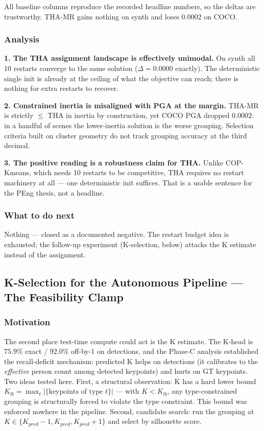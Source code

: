 \vspace{0.5em}

All baseline columns reproduce the recorded headline numbers, so the deltas are trustworthy. THA-MR gains nothing on synth and loses $0.0002$ on COCO.

\subsubsection{Analysis}

\textbf{1. The THA assignment landscape is effectively unimodal.} On synth all 10 restarts converge to the same solution ($\Delta = 0.0000$ exactly). The deterministic single init is already at the ceiling of what the objective can reach; there is nothing for extra restarts to recover.

\textbf{2. Constrained inertia is misaligned with PGA at the margin.} THA-MR is strictly $\leq$ THA in inertia by construction, yet COCO PGA dropped $0.0002$: in a handful of scenes the lower-inertia solution is the worse grouping. Selection criteria built on cluster geometry do not track grouping accuracy at the third decimal.

\textbf{3. The positive reading is a robustness claim for THA.} Unlike COP-Kmeans, which needs 10 restarts to be competitive, THA requires no restart machinery at all --- one deterministic init suffices. That is a usable sentence for the PEng thesis, not a headline.

\subsubsection{What to do next}

Nothing --- closed as a documented negative. The restart budget idea is exhausted; the follow-up experiment (K-selection, below) attacks the K estimate instead of the assignment.

\subsection{K-Selection for the Autonomous Pipeline --- The Feasibility Clamp}

\subsubsection{Motivation}

The second place test-time compute could act is the K estimate. The K-head is $75.9\%$ exact / $92.0\%$ off-by-1 on detections, and the Phase-C analysis established the recall-deficit mechanism: predicted K helps on detections (it calibrates to the \emph{effective} person count among detected keypoints) and hurts on GT keypoints. Two ideas tested here. First, a structural observation: K has a hard lower bound $K_{lb} = \max_t |\{\text{keypoints of type } t\}|$ --- with $K < K_{lb}$, any type-constrained grouping is structurally forced to violate the type constraint. This bound was enforced nowhere in the pipeline. Second, candidate search: run the grouping at $K \in \{K_{pred}-1, K_{pred}, K_{pred}+1\}$ and select by silhouette score.

